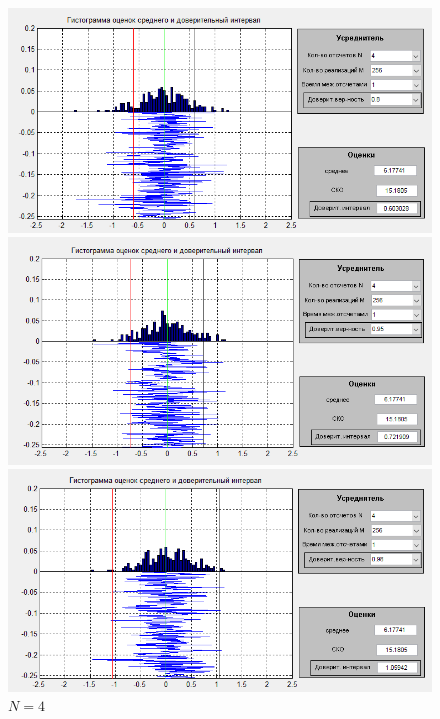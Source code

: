  \begin{figure}[H]
	\begin{minipage}{0.3\linewidth}
		\centering
        \includegraphics[width=\linewidth]{fig/realize_b1N2}
		\caption*{$\beta =0.8$}
	\end{minipage}
	\begin{minipage}{0.3\linewidth}
		\centering
        \includegraphics[width=\linewidth]{fig/realize_b2N2}
		\caption*{$\beta =0.95$}
	\end{minipage}
	\begin{minipage}{0.3\linewidth}
		\centering
        \includegraphics[width=\linewidth]{fig/realize_b3N2}
        \caption*{$\beta =0.98$}
	\end{minipage}
	\caption*{$N=4$}
	
\end{figure}
